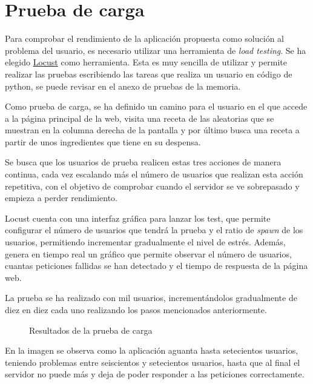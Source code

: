 \section{Prueba de carga}
Para comprobar el rendimiento de la aplicación propuesta como solución al problema del usuario, es necesario utilizar una herramienta de \emph{load testing}. Se ha elegido \href{https://locust.io/}{Locust} como herramienta. Esta es muy sencilla de utilizar y permite realizar las pruebas escribiendo las tareas que realiza un usuario en código de \Gls{python}, se puede revisar en el anexo de pruebas de la memoria.

Como prueba de carga, se ha definido un camino para el usuario en el que accede a la página principal de la web, visita una receta de las aleatorias que se muestran en la columna derecha de la pantalla y por último busca una receta a partir de unos ingredientes que tiene en su despensa.

Se busca que los usuarios de prueba realicen estas tres acciones de manera continua, cada vez escalando más el número de usuarios que realizan esta acción repetitiva, con el objetivo de comprobar cuando el servidor se ve sobrepasado y empieza a perder rendimiento. 

Locust cuenta con una interfaz gráfica para lanzar los \gls{test}, que permite configurar el número de usuarios que tendrá la prueba y el ratio de \emph{spawn} de los usuarios, permitiendo incrementar gradualmente el nivel de estrés. Además, genera en tiempo real un gráfico que permite observar el número de usuarios, cuantas peticiones fallidas se han detectado y el tiempo de respuesta de la página web.

La prueba se ha realizado con mil usuarios, incrementándolos gradualmente de diez en diez cada uno realizando los pasos mencionados anteriormente. 

\begin{figure}[H]
    \caption{Resultados de la prueba de carga}
    \label{fig:prueba de carga}
\end{figure}

En la imagen se observa como la aplicación aguanta hasta setecientos usuarios, teniendo problemas entre seiscientos y setecientos usuarios, hasta que al final el servidor no puede más y deja de poder responder a las peticiones correctamente.